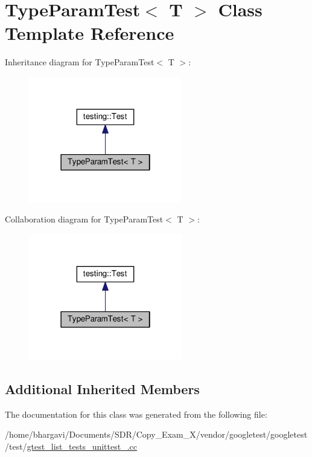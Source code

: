 \hypertarget{class_type_param_test}{}\section{Type\+Param\+Test$<$ T $>$ Class Template Reference}
\label{class_type_param_test}


Inheritance diagram for Type\+Param\+Test$<$ T $>$\+:
\nopagebreak
\begin{figure}[H]
\begin{center}
\leavevmode
\includegraphics[width=190pt]{class_type_param_test__inherit__graph}
\end{center}
\end{figure}


Collaboration diagram for Type\+Param\+Test$<$ T $>$\+:
\nopagebreak
\begin{figure}[H]
\begin{center}
\leavevmode
\includegraphics[width=190pt]{class_type_param_test__coll__graph}
\end{center}
\end{figure}
\subsection*{Additional Inherited Members}


The documentation for this class was generated from the following file\+:\begin{DoxyCompactItemize}
\item 
/home/bhargavi/\+Documents/\+S\+D\+R/\+Copy\+\_\+\+Exam\+\_\+X/vendor/googletest/googletest/test/\hyperlink{gtest__list__tests__unittest___8cc}{gtest\+\_\+list\+\_\+tests\+\_\+unittest\+\_\+.\+cc}\end{DoxyCompactItemize}
